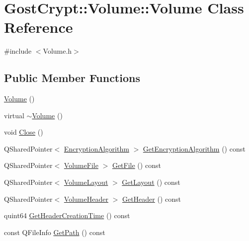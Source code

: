 \hypertarget{class_gost_crypt_1_1_volume_1_1_volume}{}\section{Gost\+Crypt\+:\+:Volume\+:\+:Volume Class Reference}
\label{class_gost_crypt_1_1_volume_1_1_volume}


{\ttfamily \#include $<$Volume.\+h$>$}

\subsection*{Public Member Functions}
\begin{DoxyCompactItemize}
\item 
\hyperlink{class_gost_crypt_1_1_volume_1_1_volume_a72438765771032734c06a4654a7cfc9c}{Volume} ()
\item 
virtual \hyperlink{class_gost_crypt_1_1_volume_1_1_volume_a295a4d4c55ba8407cf2b894bdf958ef3}{$\sim$\+Volume} ()
\item 
void \hyperlink{class_gost_crypt_1_1_volume_1_1_volume_acd693e8d3c7bd6b42b84f5a08b15cd88}{Close} ()
\item 
Q\+Shared\+Pointer$<$ \hyperlink{class_gost_crypt_1_1_volume_1_1_encryption_algorithm}{Encryption\+Algorithm} $>$ \hyperlink{class_gost_crypt_1_1_volume_1_1_volume_ad7f54d26e2c40a7917ec42522b66512e}{Get\+Encryption\+Algorithm} () const
\item 
Q\+Shared\+Pointer$<$ \hyperlink{class_gost_crypt_1_1_volume_1_1_volume_file}{Volume\+File} $>$ \hyperlink{class_gost_crypt_1_1_volume_1_1_volume_a7bab5973777d5d3c7ae24450c5ee12ee}{Get\+File} () const
\item 
Q\+Shared\+Pointer$<$ \hyperlink{class_gost_crypt_1_1_volume_1_1_volume_layout}{Volume\+Layout} $>$ \hyperlink{class_gost_crypt_1_1_volume_1_1_volume_a23fee31dc7d9c0e1a55f46cacaa69e05}{Get\+Layout} () const
\item 
Q\+Shared\+Pointer$<$ \hyperlink{class_gost_crypt_1_1_volume_1_1_volume_header}{Volume\+Header} $>$ \hyperlink{class_gost_crypt_1_1_volume_1_1_volume_a6083fe6529f9eba59f5136c6a95b855e}{Get\+Header} () const
\item 
quint64 \hyperlink{class_gost_crypt_1_1_volume_1_1_volume_a429e3f1abc6821be7119683b66f1331f}{Get\+Header\+Creation\+Time} () const
\item 
const Q\+File\+Info \hyperlink{class_gost_crypt_1_1_volume_1_1_volume_a8923a079f30098545a505fb10399c540}{Get\+Path} () const

\end{DoxyCompactItemize}
